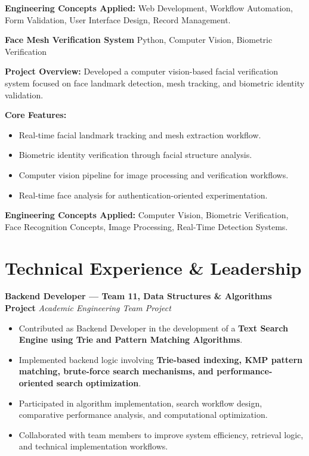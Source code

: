 \documentclass[a4paper,11pt]{article}
\newcommand{\resumeProject}[2]{
\textbf{#1} \hfill {\small #2}
}
\begin{document}
\textbf{Engineering Concepts Applied:}
Web Development, Workflow Automation, Form Validation, User Interface Design, Record Management.

\vspace{4pt}

\resumeProject
{Face Mesh Verification System}
{Python, Computer Vision, Biometric Verification}

\textbf{Project Overview:}
Developed a computer vision-based facial verification system focused on face landmark detection, mesh tracking, and biometric identity validation.

\textbf{Core Features:}
\begin{itemize}
    \item Real-time facial landmark tracking and mesh extraction workflow.
    
    \item Biometric identity verification through facial structure analysis.
    
    \item Computer vision pipeline for image processing and verification workflows.
    
    \item Real-time face analysis for authentication-oriented experimentation.
\end{itemize}

\textbf{Engineering Concepts Applied:}
Computer Vision, Biometric Verification, Face Recognition Concepts, Image Processing, Real-Time Detection Systems.









\section{Technical Experience \& Leadership}

\textbf{Backend Developer --- Team 11, Data Structures \& Algorithms Project}
\hfill \textit{Academic Engineering Team Project}

\begin{itemize}

    \item Contributed as Backend Developer in the development of a \textbf{Text Search Engine using Trie and Pattern Matching Algorithms}.

    \item Implemented backend logic involving \textbf{Trie-based indexing, KMP pattern matching, brute-force search mechanisms, and performance-oriented search optimization}.

    \item Participated in algorithm implementation, search workflow design, comparative performance analysis, and computational optimization.

    \item Collaborated with team members to improve system efficiency, retrieval logic, and technical implementation workflows.

\end{itemize}
\end{document}
